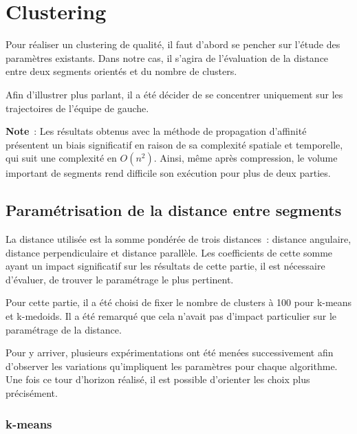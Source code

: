 \section{Clustering}

Pour réaliser un clustering de qualité, il faut d'abord se pencher sur l'étude des paramètres existants. Dans notre cas, il s'agira de l'évaluation de la distance entre deux segments orientés et du nombre de clusters.

Afin d'illustrer plus parlant, il a été décider de se concentrer uniquement sur les trajectoires de l'équipe de gauche.

\textbf{Note}~: Les résultats obtenus avec la méthode de propagation d'affinité présentent un biais significatif en raison de sa complexité spatiale et temporelle, qui suit une complexité en $O(n^2)$. Ainsi, même après compression, le volume important de segments rend difficile son exécution pour plus de deux parties.

\subsection{Paramétrisation de la distance entre segments}

La distance utilisée est la somme pondérée de trois distances~: distance angulaire, distance perpendiculaire et distance parallèle. Les coefficients de cette somme ayant un impact significatif sur les résultats de cette partie, il est nécessaire d'évaluer, de trouver le paramétrage le plus pertinent. 

Pour cette partie, il a été choisi de fixer le nombre de clusters à 100 pour k-means et k-medoids. Il a été remarqué que cela n'avait pas d'impact particulier sur le paramétrage de la distance.

Pour y arriver, plusieurs expérimentations ont été menées successivement afin d'observer les variations qu'impliquent les paramètres pour chaque algorithme. Une fois ce tour d'horizon réalisé, il est possible d'orienter les choix plus précisément. 

\subsubsection{k-means}




